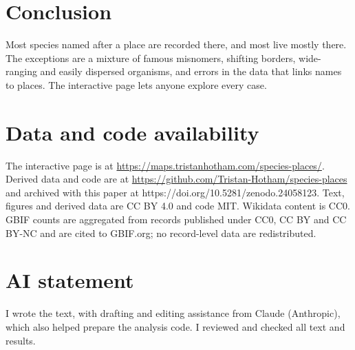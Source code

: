 \documentclass[11pt,a4paper]{article}
\begin{document}
\section{Conclusion}
Most species named after a place are recorded there, and most live mostly there. The exceptions are a mixture of famous misnomers, shifting borders, wide-ranging and easily dispersed organisms, and errors in the data that links names to places. The interactive page lets anyone explore every case.

\section*{Data and code availability}
The interactive page is at \url{https://maps.tristanhotham.com/species-places/}. Derived data and code are at \url{https://github.com/Tristan-Hotham/species-places} and archived with this paper at https://doi.org/10.5281/zenodo.24058123. Text, figures and derived data are CC BY 4.0 and code MIT. Wikidata content is CC0. GBIF counts are aggregated from records published under CC0, CC BY and CC BY-NC and are cited to GBIF.org; no record-level data are redistributed.

\section*{AI statement}
I wrote the text, with drafting and editing assistance from Claude (Anthropic), which also helped prepare the analysis code. I reviewed and checked all text and results.
\end{document}
